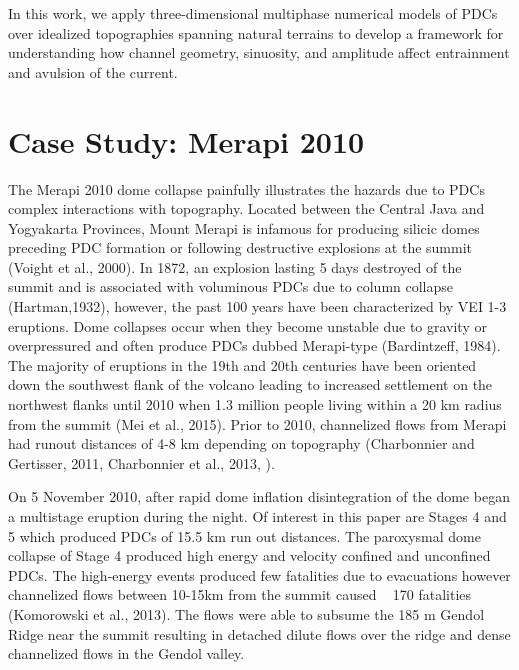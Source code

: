 In this work, we apply three-dimensional multiphase numerical models of PDCs over idealized topographies spanning natural terrains to develop a framework for understanding how channel geometry, sinuosity, and amplitude affect entrainment and avulsion of the current.  

\section{Case Study: Merapi 2010}
\label{sec:Case}
The Merapi 2010 dome collapse painfully illustrates the hazards due to PDCs complex interactions with topography. Located between the Central Java and Yogyakarta Provinces, Mount Merapi is infamous for producing silicic domes preceding PDC formation or following destructive explosions at the summit (Voight et al., 2000). In 1872, an explosion lasting 5 days destroyed of the summit and is associated with voluminous PDCs due to column collapse (Hartman,1932), however, the past 100 years have been characterized by VEI 1-3 eruptions. Dome collapses occur when they become unstable due to gravity or overpressured and often produce PDCs dubbed Merapi-type (Bardintzeff, 1984). The majority of eruptions in the 19th and 20th centuries have been oriented down the southwest flank of the volcano leading to increased settlement on the northwest flanks until 2010 when 1.3 million people living within a 20 km radius from the summit (Mei et al., 2015). Prior to 2010, channelized flows from Merapi had runout distances of 4-8 km depending on topography (Charbonnier and Gertisser, 2011, Charbonnier et al., 2013, ).

On 5 November 2010, after rapid dome inflation disintegration of the dome began a multistage eruption during the night. Of interest in this paper are Stages 4 and 5 which produced PDCs of 15.5 km run out distances. The paroxysmal dome collapse of Stage 4 produced high energy and velocity confined and unconfined PDCs. The high-energy events produced few fatalities due to evacuations however channelized flows between 10-15km from the summit caused ~ 170 fatalities (Komorowski et al., 2013).  The flows were able to subsume the 185 m Gendol Ridge near the summit resulting in detached dilute flows over the ridge and dense channelized flows in the Gendol valley. 

